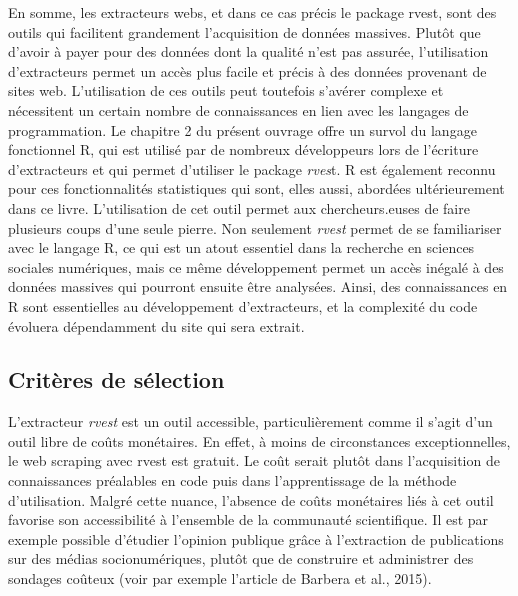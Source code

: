 \documentclass[
  letterpaper,
  DIV=11,
  numbers=noendperiod]{scrreprt}
\begin{document}
En somme, les extracteurs webs, et dans ce cas précis le package rvest,
sont des outils qui facilitent grandement l'acquisition de données
massives. Plutôt que d'avoir à payer pour des données dont la qualité
n'est pas assurée, l'utilisation d'extracteurs permet un accès plus
facile et précis à des données provenant de sites web. L'utilisation de
ces outils peut toutefois s'avérer complexe et nécessitent un certain
nombre de connaissances en lien avec les langages de programmation. Le
chapitre 2 du présent ouvrage offre un survol du langage fonctionnel R,
qui est utilisé par de nombreux développeurs lors de l'écriture
d'extracteurs et qui permet d'utiliser le package \emph{rves}t. R est
également reconnu pour ces fonctionnalités statistiques qui sont, elles
aussi, abordées ultérieurement dans ce livre. L'utilisation de cet outil
permet aux chercheurs.euses de faire plusieurs coups d'une seule pierre.
Non seulement \emph{rvest} permet de se familiariser avec le langage R,
ce qui est un atout essentiel dans la recherche en sciences sociales
numériques, mais ce même développement permet un accès inégalé à des
données massives qui pourront ensuite être analysées. Ainsi, des
connaissances en R sont essentielles au développement d'extracteurs, et
la complexité du code évoluera dépendamment du site qui sera extrait.

\hypertarget{crituxe8res-de-suxe9lection-1}{%
\subsection{Critères de sélection}\label{crituxe8res-de-suxe9lection-1}}

L'extracteur \emph{rvest} est un outil accessible, particulièrement
comme il s'agit d'un outil libre de coûts monétaires. En effet, à moins
de circonstances exceptionnelles, le web scraping avec rvest est
gratuit. Le coût serait plutôt dans l'acquisition de connaissances
préalables en code puis dans l'apprentissage de la méthode
d'utilisation. Malgré cette nuance, l'absence de coûts monétaires liés à
cet outil favorise son accessibilité à l'ensemble de la communauté
scientifique. Il est par exemple possible d'étudier l'opinion publique
grâce à l'extraction de publications sur des médias socionumériques,
plutôt que de construire et administrer des sondages coûteux (voir par
exemple l'article de Barbera et al., 2015).
\end{document}
